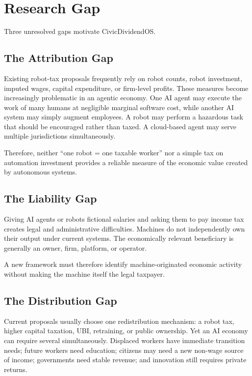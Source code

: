 \documentclass[conference]{IEEEtran}
\begin{document}
\section{Research Gap}

Three unresolved gaps motivate CivicDividendOS.

\subsection{The Attribution Gap}

Existing robot-tax proposals frequently rely on robot counts, robot investment,
imputed wages, capital expenditure, or firm-level profits. These measures become
increasingly problematic in an agentic economy. One AI agent may execute the
work of many humans at negligible marginal software cost, while another AI
system may simply augment employees. A robot may perform a hazardous task that
should be encouraged rather than taxed. A cloud-based agent may serve multiple
jurisdictions simultaneously.

Therefore, neither ``one robot = one taxable worker'' nor a simple tax on
automation investment provides a reliable measure of the economic value created
by autonomous systems.

\subsection{The Liability Gap}

Giving AI agents or robots fictional salaries and asking them to pay income tax
creates legal and administrative difficulties. Machines do not independently
own their output under current systems. The economically relevant beneficiary
is generally an owner, firm, platform, or operator.

A new framework must therefore identify machine-originated economic activity
without making the machine itself the legal taxpayer.

\subsection{The Distribution Gap}

Current proposals usually choose one redistribution mechanism: a robot tax,
higher capital taxation, UBI, retraining, or public ownership. Yet an AI economy
can require several simultaneously. Displaced workers have immediate transition
needs; future workers need education; citizens may need a new non-wage source of
income; governments need stable revenue; and innovation still requires private
returns.
\end{document}
